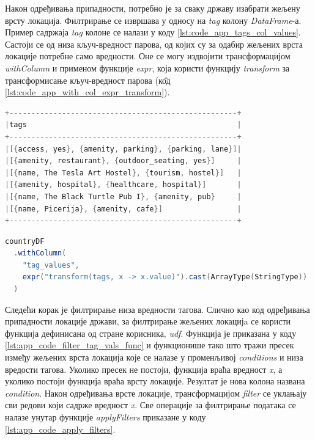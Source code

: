 \documentclass[12pt,oneside]{memoir}
\begin{document}
Након одређивања припадности, потребно је за сваку државу изабрати жељену врсту локација. Филтрирање се извршава у односу на \textit{tag} колону \textit{DataFrame}-а. Пример садржаја \textit{tag} колоне се налази у коду \ref{lst:code_app_tags_col_values}. Састоји се од низа кључ-вредност парова, од којих су за одабир жељених врста локације потребне само вредности. Оне се могу издвојити трансформацијом \textit{withColumn} и применом функције \textit{expr}, која користи функцију \textit{transform} за трансформисање кључ-вредност парова (к\^{о}д \ref{lst:code_app_with_col_expr_transform}).

\begin{lstlisting}[caption={Пример вредности \textit{tag} колоне}, language=Scala, label={lst:code_app_tags_col_values}]
+----------------------------------------------------+
|tags                                                |
+----------------------------------------------------+
|[{access, yes}, {amenity, parking}, {parking, lane}]|
|[{amenity, restaurant}, {outdoor_seating, yes}]     |
|[{name, The Tesla Art Hostel}, {tourism, hostel}]   |
|[{amenity, hospital}, {healthcare, hospital}]       |
|[{name, The Black Turtle Pub I}, {amenity, pub}     |
|[{name, Picerija}, {amenity, cafe}]                 |
+----------------------------------------------------+
\end{lstlisting}

\begin{lstlisting}[caption={Конструкција низа вредности \textit{tag} колоне}, language=Scala, label={lst:code_app_with_col_expr_transform}]
countryDF
  .withColumn(
    "tag_values",
    expr("transform(tags, x -> x.value)").cast(ArrayType(StringType))
  )
\end{lstlisting}

Следећи корак је филтрирање низа вредности тагова. Слично као код одређивања припадности локације држави, за филтрирање жељених локацијa се користи функција дефинисана од стране корисника, \textit{udf}. Функција је приказана у коду \ref{lst:app_code_filter_tag_vals_func} и функционише тако што тражи пресек између жељених врста локација које се налазе у променљивој \textit{conditions} и низа вредости тагова. Уколико пресек не постоји, функција враћа вредност \textit{x}, а уколико постоји функција враћа врсту локације. Резултат је нова колона названа \textit{condition}. Након одређивања врсте локације, трансформацијом \textit{filter} се уклањају сви редови који садрже вредност \textit{x}. Све операције за филтрирање података се налазе унутар функције \textit{applyFilters} приказане у коду \ref{lst:app_code_apply_filters}.
\end{document}
